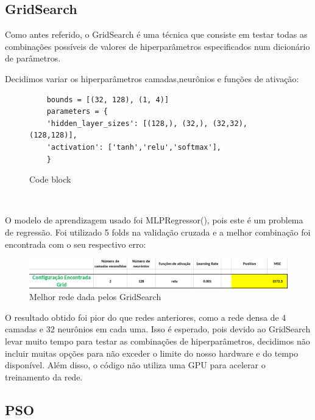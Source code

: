 \documentclass[10pt]{article}
\begin{document}
\subsection{GridSearch}
Como antes referido, o GridSearch é uma técnica que consiste em testar todas as combinações 
possíveis de valores de hiperparâmetros especificados num dicionário de parâmetros.

Decidimos variar os hiperparâmetros camadas,neurônios e funções de ativação:

\begin{figure}[htb]
  \begin{verbatim}
    bounds = [(32, 128), (1, 4)]
    parameters = {
    'hidden_layer_sizes': [(128,), (32,), (32,32), (128,128)],
    'activation': ['tanh','relu','softmax'],
    }
  \end{verbatim}
  \caption{Code block}
  \label{fig:code_1}
\end{figure}

\begin{verbatim}
  
\end{verbatim}

\newpage
O modelo de aprendizagem usado foi MLPRegressor(), pois este é um problema de regressão. 
Foi utilizado 5 folds na validação cruzada e a melhor combinação foi encontrada com o seu 
respectivo erro:

\begin{figure}[htb]
  \centering
  \includegraphics[width=\linewidth]{img/grid.png}
  \caption{Melhor rede dada pelos GridSearch}
  \label{fig:grid}
\end{figure}

O resultado obtido foi pior do que redes anteriores, como a rede densa de 4 camadas e 
32 neurônios em cada uma. Isso é esperado, pois devido ao GridSearch levar muito tempo para 
testar as combinações de hiperparâmetros, decidimos não incluir muitas opções para não exceder 
o limite do nosso hardware e do tempo disponível. Além disso, o código não utiliza uma GPU para 
acelerar o treinamento da rede.

\subsection{PSO}
\end{document}
